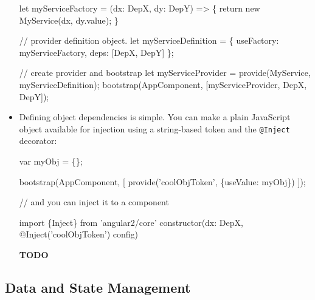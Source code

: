\documentclass[12pt,]{article}
\newenvironment{Shaded}{}{}
\newcommand{\KeywordTok}[1]{\textcolor[rgb]{0.00,0.00,1.00}{{#1}}}
\newcommand{\CommentTok}[1]{\textcolor[rgb]{0.00,0.50,0.00}{{#1}}}
\newcommand{\FunctionTok}[1]{{#1}}
\newcommand{\NormalTok}[1]{{#1}}
\begin{document}
\begin{itemize}
\begin{Shaded}
\begin{Highlighting}[numbers=left,,]
\NormalTok{let myServiceFactory = (dx: DepX, dy: DepY) => \{}
  \KeywordTok{return} \KeywordTok{new} \FunctionTok{MyService}\NormalTok{(dx, dy.}\FunctionTok{value}\NormalTok{);}
\NormalTok{\}}

\CommentTok{// provider definition object.}
\NormalTok{let myServiceDefinition = \{}
   \NormalTok{useFactory: myServiceFactory,}
   \NormalTok{deps: [DepX, DepY]}
\NormalTok{\};}

\CommentTok{// create provider and bootstrap}
\NormalTok{let myServiceProvider = }\FunctionTok{provide}\NormalTok{(MyService, myServiceDefinition);}
\FunctionTok{bootstrap}\NormalTok{(AppComponent, [myServiceProvider, DepX, DepY]);}
\end{Highlighting}
\end{Shaded}
\item
  Defining object dependencies is simple. You can make a plain
  JavaScript object available for injection using a string-based token
  and the \texttt{@Inject} decorator:

\begin{Shaded}
\begin{Highlighting}[numbers=left,,]
\NormalTok{var myObj = \{\};}

\FunctionTok{bootstrap}\NormalTok{(AppComponent, [}
  \FunctionTok{provide}\NormalTok{('coolObjToken', \{useValue: myObj\})}
\NormalTok{]);}

\CommentTok{// and you can inject it to a component}

\KeywordTok{import} \NormalTok{\{Inject\} from 'angular2/core'}
\FunctionTok{constructor}\NormalTok{(dx: DepX, }\FunctionTok{@Inject}\NormalTok{('coolObjToken') config)}
\end{Highlighting}
\end{Shaded}

  \textbf{TODO}
\end{itemize}

\subsection{Data and State Management}\label{data-and-state-management}
\end{document}
